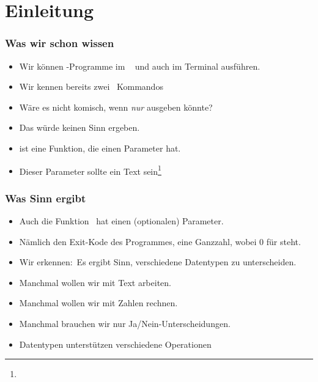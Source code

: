 \documentclass[aspectratio=169,mathserif,notheorems]{beamer}%
\subtitle{7.~Der Datentyp int}%
\begin{document}
%
%
\startPresentation%
%
\section{Einleitung}%
%
\begin{frame}%
\frametitle{Was wir schon wissen}%
\begin{itemize}%
\item Wir können \python-Programme im \pycharm\  und auch im Terminal ausführen.%
\item<2-> Wir kennen bereits zwei \python\ Kommandos%
\item<5-> Wäre es nicht komisch, wenn  \emph{nur}  ausgeben könnte?%
\item<6-> Das würde keinen Sinn ergeben.%
\item<7->  ist eine Funktion, die einen Parameter hat.%
\item<8-> Dieser Parameter sollte ein Text sein\footnote<8->{}%
\end{itemize}%
\end{frame}%
%
\begin{frame}%
\frametitle{Was Sinn ergibt}%
\begin{itemize}%
\item Auch die Funktion~ hat einen (optionalen) Parameter.%
\item<2-> Nämlich den Exit-Kode des Programmes\cite{J2024PTOGBSI8IS12E:TAP}, eine Ganzzahl, wobei 0 für  steht.\medskip%
\item<3-> Wir erkennen:~Es ergibt Sinn, verschiedene Datentypen zu unterscheiden.%
\item<4-> Manchmal wollen wir mit Text arbeiten.%
\item<5-> Manchmal wollen wir mit Zahlen rechnen.%
\item<6-> Manchmal brauchen wir nur Ja/Nein-Unterscheidungen.%
\item<7-> Datentypen unterstützen verschiedene Operationen%
\end{itemize}%
\end{frame}%
\end{document}
